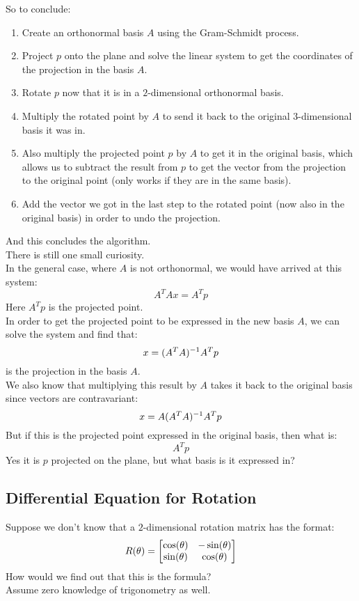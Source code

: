 \documentclass[12pt]{article}
\begin{document}
So to conclude:
\begin{enumerate}
    \item 
    Create an orthonormal basis $A$
    using the Gram-Schmidt process.
    \item 
    Project $p$ onto the plane
    and solve the linear system to get
    the coordinates of the projection
    in the basis $A$.
    \item 
    Rotate $p$ now that it is in a $2$-dimensional
    orthonormal basis.
    \item
    Multiply the rotated point by $A$
    to send it back to the original $3$-dimensional
    basis it was in.
    \item 
    Also multiply the projected point $p$
    by $A$ to get it in the original basis,
    which allows us to subtract the result
    from $p$ to get the vector from
    the projection to the original point
    (only works if they are in the same basis).
    \item 
    Add the vector we got in the last step
    to the rotated point (now also in the original
    basis) in order to undo the projection.
\end{enumerate}
And this concludes the algorithm. \\

There is still one small curiosity. \\
In the general case, where $A$
is not orthonormal,
we would have arrived at this system:
\[ A^TAx = A^Tp \]
Here $A^Tp$ is the projected point. \\
In order to get the projected point
to be expressed in the new basis $A$,
we can solve the system and find that:
\[ x = (A^TA)^{-1} A^Tp  \]
is the projection in the basis $A$. \\
We also know that multiplying
this result by $A$
takes it back to the original basis
since vectors are contravariant:
\[ x = A(A^TA)^{-1} A^Tp \]
But if this is the projected point
expressed in the original basis,
then what is:
\[  A^Tp \]
Yes it is $p$ projected on the plane,
but what basis is it expressed in? \\

\newpage

\subsection*{Differential Equation for Rotation}

Suppose we don't know that a $2$-dimensional rotation
matrix has the format:
\[ R(\theta) = 
\begin{bmatrix} \cos(\theta) & -\sin(\theta) \\ \sin(\theta) & \cos(\theta) \end{bmatrix} \]
How would we find out that this is
the formula? \\
Assume zero knowledge of trigonometry as well. \\
\end{document}
